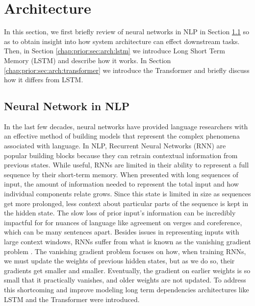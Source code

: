 \section{Architecture}
\label{chap:prior:sec:arch}
In this section, we first briefly review of neural networks in NLP in Section \ref{chap:prior:sec:arch:nn} so as to obtain insight into how system architecture can effect downstream tasks. Then, in Section \ref{chap:prior:sec:arch:lstm} we introduce Long Short Term Memory (LSTM) \cite{Hochreiter1997LongSM} and describe how it works. In Section \ref{chap:prior:sec:arch:transformer} we introduce the Transformer \cite{Vaswani2017AttentionIA} and briefly discuss how it differs from LSTM.
\subsection{Neural Network in NLP}
\label{chap:prior:sec:arch:nn}
In the last few decades, neural networks have provided language researchers with an effective method of building models that represent the complex phenomena associated with language. In NLP, Recurrent Neural Networks (RNN) are popular building blocks because they can retrain contextual information from previous states. While useful, RNNs are limited in their ability to represent a full sequence by their short-term memory. When presented with long sequences of input, the amount of information needed to represent the total input and how individual components relate grows. Since this state is limited in size as sequences get more prolonged, less context about particular parts of the sequence is kept in the hidden state. The slow loss of prior input's information can be incredibly impactful for for nuances of language like agreement on verges and coreference, which can be many sentences apart. Besides issues in representing inputs with large context windows, RNNs suffer from what is known as the vanishing gradient problem \cite{Hochreiter1998TheVG}. The vanishing gradient problem focuses on how, when training RNNs, we must update the weights of previous hidden states, but as we do so, their gradients get smaller and smaller. Eventually, the gradient on earlier weights is so small that it practically vanishes, and older weights are not updated. To address this shortcoming and improve modeling long term dependencies architectures like LSTM and the Transformer were introduced. 
